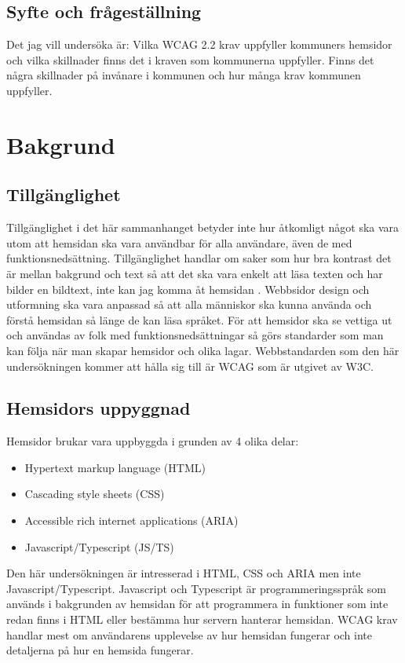 \documentclass[11p]{article}
\begin{document}
    \subsection{Syfte och frågeställning}
    Det jag vill undersöka är:
    Vilka WCAG 2.2 krav uppfyller kommuners hemsidor och vilka skillnader finns det i kraven som kommunerna uppfyller.
    Finns det några skillnader på invånare i kommunen och hur många krav kommunen uppfyller.

    \section{Bakgrund}

    \subsection{Tillgänglighet}
    Tillgänglighet i det här sammanhanget betyder inte hur åtkomligt något ska vara utom att hemsidan ska vara användbar för alla användare, även de med funktionsnedsättning.
    Tillgänglighet handlar om saker som hur bra kontrast det är mellan bakgrund och text så att det ska vara enkelt att läsa texten och har bilder en bildtext, inte kan jag komma åt hemsidan \parencite{webbriktlinjer}.
    Webbsidor design och utformning ska vara anpassad så att alla människor ska kunna använda och förstå hemsidan så länge de kan läsa språket.
    För att hemsidor ska se vettiga ut och användas av folk med funktionsnedsättningar så görs standarder som man kan följa när man skapar hemsidor och olika lagar.
    Webbstandarden som den här undersökningen kommer att hålla sig till är WCAG som är utgivet av W3C.


    \subsection{Hemsidors uppyggnad}
    Hemsidor brukar vara uppbyggda i grunden av 4 olika delar:
    \begin{itemize}
        \item Hypertext markup language (HTML)
        \item Cascading style sheets (CSS)
        \item Accessible rich internet applications (ARIA)
        \item Javascript/Typescript (JS/TS)
    \end{itemize}
    Den här undersökningen är intresserad i HTML, CSS och ARIA men inte Javascript/Typescript.
    Javascript och Typescript är programmeringsspråk som används i bakgrunden av hemsidan för att programmera in funktioner som inte redan finns i HTML eller bestämma hur servern hanterar hemsidan.
    WCAG krav handlar mest om användarens upplevelse av hur hemsidan fungerar och inte detaljerna på hur en hemsida fungerar.
\end{document}
